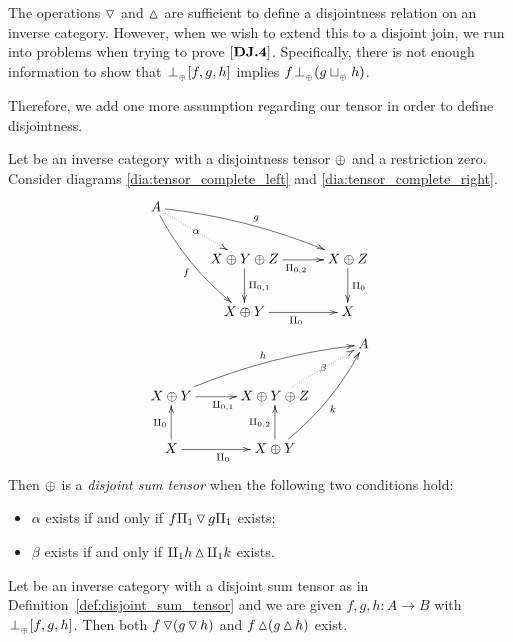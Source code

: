 The operations $\operatorname{\triangledown}$ and $\operatorname{\vartriangle}$ are sufficient to define a disjointness relation
on an inverse category. However, when we wish to extend this to a disjoint join, we run into
problems when trying to prove $[\text{\bfseries {DJ}.{4}}]$. Specifically, there is not enough information to
show that ${}_{{}_{}}{\perp_{{}_{\oplus}}} [f,g,h]$ implies $f {}_{{}_{}}{\perp_{{}_{\oplus}}} (g \sqcup_{{_{\oplus}}} h)$.

Therefore, we add one more assumption regarding our tensor in order to define disjointness.

\begin{definition}\label{def:disjoint_sum_tensor}
  Let \X be an inverse category with a disjointness tensor $\oplus$ and a restriction zero. Consider
  diagrams \ref{dia:tensor_complete_left} and \ref{dia:tensor_complete_right}.
  \begin{align}
    &\xymatrix@C+5pt{
      A \ar@/_/[ddr]_f \ar@/^/[drr]^g \ar@{.>}[dr]|-{\alpha} \\
        & X\+Y\+Z \ar[d]^{\Pi_{0,1}} \ar[r]_{\Pi_{0,2}} & X\+Z \ar[d]^{\Pi_0} \\
        & X\+Y \ar[r]_{\Pi_0} & X
    } \label{dia:tensor_complete_left}\\
    &\xymatrix@C+5pt{
        &&A \\
         X\+Y \ar[r]_{\cp{0,1}} \ar@/^/[urr]^h &X\+Y\+Z \ar@{.>}[ur]|-{\beta} \\
         X \ar[u]^{\cpa} \ar[r]_{\cpa} & X\+Y \ar[u]^{\cp{0,2}} \ar@/_/[uur]_k
    } \label{dia:tensor_complete_right}
  \end{align}
  Then
  $\oplus$ is a \emph{disjoint sum tensor} when the following two conditions hold:
  \begin{itemize}
    \item $\alpha$ exists if and only if  $f \Pi_1 \operatorname{\triangledown} g \Pi_1$ exists;
    \item $\beta$ exists if and only if $\amalg_{1} h \operatorname{\vartriangle} \amalg_{1} k$ exists.
  \end{itemize}

\end{definition}
\begin{lemma}\label{lem:complete_disjointness_means_multiple_disjoints}
  Let \X be an inverse category with a disjoint sum tensor as in
  Definition~\ref{def:disjoint_sum_tensor} and we are given $f,g,h:A\to B$ with
  ${}_{{}_{}}{\perp_{{}_{\oplus}}}[f,g,h]$. Then both $f \operatorname{\triangledown} (g \operatorname{\triangledown} h)$ and $f\operatorname{\vartriangle}(g\operatorname{\vartriangle} h)$ exist.
\end{lemma}

